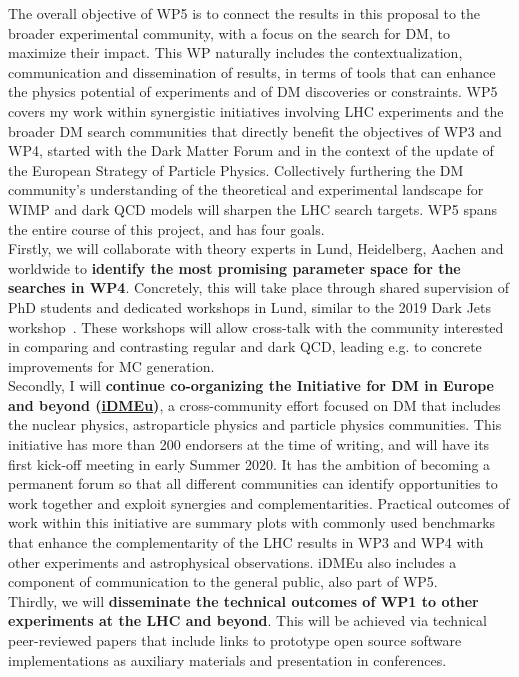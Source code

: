 The overall objective of WP5 is to connect the results in this proposal to the broader experimental community, with a focus on the search for DM, to maximize their impact. 
This WP naturally includes the contextualization, communication and dissemination of results, in terms of tools that can enhance the physics potential of experiments and of DM discoveries or constraints. WP5 covers my work within synergistic initiatives involving LHC experiments and the broader DM search communities that directly benefit the objectives of WP3 and WP4, started with the Dark Matter Forum and in the context of the update of the European Strategy of Particle Physics. Collectively furthering the DM community’s understanding of the theoretical and experimental landscape for WIMP and dark QCD models will sharpen the LHC search targets. WP5 spans the entire course of this project, and has four goals. 
\\
\indent
Firstly, we will collaborate with theory experts in Lund, Heidelberg, Aachen and worldwide to \textbf{identify the most promising parameter space for the searches in WP4}.
Concretely, this will take place through shared supervision of PhD students and dedicated workshops in Lund, similar to the 2019 Dark Jets workshop~\cite{ToBeCited}. %
These workshops will allow cross-talk with the community interested in comparing and contrasting regular and dark QCD, leading e.g. to concrete improvements for MC generation. 
\\
\indent
Secondly, I will \textbf{continue co-organizing the Initiative for DM in Europe and beyond (\href{https://indico.cern.ch/e/iDMEu/}{iDMEu})}, a cross-community effort focused on DM that includes the nuclear physics, astroparticle physics and particle physics communities. 
This initiative has more than 200 endorsers at the time of writing, and will have its first kick-off meeting in early Summer 2020. 
It has the ambition of becoming a permanent forum so that all different communities can identify opportunities to work together and exploit synergies and complementarities. 
Practical outcomes of work within this initiative are summary plots with commonly used benchmarks that enhance the complementarity of the LHC results in WP3 and WP4 with other experiments and astrophysical observations. iDMEu also includes a component of communication to the general public, also part of WP5. 
\\
\indent
Thirdly, we will \textbf{disseminate the technical outcomes of WP1 to other experiments at the LHC and beyond}. 
This will be achieved via technical peer-reviewed papers that include links to prototype open source software implementations as auxiliary materials and presentation in conferences. 
